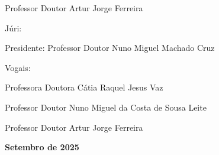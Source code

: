 \documentclass[11pt,a4paper]{report}
\begin{document}
\begin{titlepage}
\begin{center}
{            {\hspace{2cm}\fontsize{10}{12}\selectfont Professor Doutor Artur Jorge Ferreira}
        }
    \end{center}
    
	\vfill

    \begin{center}
        \parbox{0.7\textwidth}{
        \raggedright
        {\hspace{1cm}\fontsize{11}{13}\selectfont Júri:}
        
        {\hspace{1.5cm}\fontsize{10}{12}\selectfont Presidente: Professor Doutor Nuno Miguel Machado Cruz}
        
        {\hspace{1.5cm}\fontsize{10}{12}\selectfont Vogais: \par}
        {\hspace{2cm}\fontsize{10}{12}\selectfont Professora Doutora Cátia Raquel Jesus Vaz \par}
        {\hspace{2cm}\fontsize{10}{12}\selectfont Professor Doutor Nuno Miguel da Costa de Sousa Leite \par}
        {\hspace{2cm}\fontsize{10}{12}\selectfont Professor Doutor Artur Jorge Ferreira \par}
        }
    \end{center}

    \vfill
	
    {\bfseries\fontsize{9}{11} Setembro de 2025 \par}
\end{titlepage}
\end{document}
